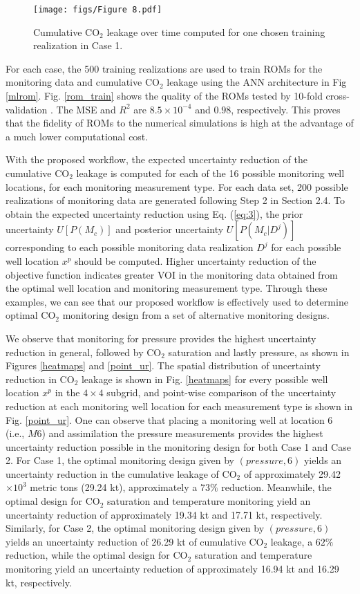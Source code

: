\documentclass[a4paper,fleqn]{cas-sc}
\begin{document}
\begin{figure}
    \centering
    \texttt{[image: figs/Figure 8.pdf]}
    \caption{Cumulative CO$_2$ leakage over time computed for one chosen training realization in Case 1.}
    \label{cum_leak_line}
\end{figure}

For each case, the 500 training realizations are used to train ROMs for the monitoring data and cumulative CO$_2$ leakage using the ANN architecture in Fig \ref{mlrom}. Fig. \ref{rom_train} shows the quality of the ROMs tested by 10-fold cross-validation \citep{Geisser1993, Xu2018249}. The MSE and $R^2$ are $8.5\times10^{-4}$ and $0.98$, respectively. This proves that the fidelity of ROMs to the numerical simulations is high at the advantage of a much lower computational cost.

With the proposed workflow, the expected uncertainty reduction of the cumulative CO$_2$ leakage is computed for each of the 16 possible monitoring well locations, for each monitoring measurement type. For each data set, 200 possible realizations of monitoring data are generated following Step 2 in Section 2.4. To obtain the expected uncertainty reduction using Eq. (\ref{eq:3}), the prior uncertainty $U[P(M_c)]$ and posterior uncertainty $U[P(M_c \vert D^j)]$ corresponding to each possible monitoring data realization $D^j$ for each possible well location $x^p$ should be computed. Higher uncertainty reduction of the objective function indicates greater VOI in the monitoring data obtained from the optimal well location and monitoring measurement type. Through these examples, we can see that our proposed workflow is effectively used to determine optimal CO$_2$ monitoring design from a set of alternative monitoring designs.

We observe that monitoring for pressure provides the highest uncertainty reduction in general, followed by CO$_2$ saturation and lastly pressure, as shown in Figures \ref{heatmaps} and \ref{point_ur}. The spatial distribution of uncertainty reduction in CO$_2$ leakage is shown in Fig. \ref{heatmaps} for every possible well location $x^p$ in the $4 \times 4$ subgrid, and point-wise comparison of the uncertainty reduction at each monitoring well location for each measurement type is shown in Fig. \ref{point_ur}. One can observe that placing a monitoring well at location 6 (i.e., $M6$) and assimilation the pressure measurements provides the highest uncertainty reduction possible in the monitoring design for both Case 1 and Case 2. For Case 1, the optimal monitoring design given by $(pressure, 6)$ yields an uncertainty reduction in the cumulative leakage of CO$_2$ of approximately 29.42$\times 10^3$ metric tons (29.24 kt), approximately a $73\%$ reduction. Meanwhile, the optimal design for CO$_2$ saturation and temperature monitoring yield an uncertainty reduction of approximately 19.34 kt and 17.71 kt, respectively. Similarly, for Case 2, the optimal monitoring design given by $(pressure, 6)$ yields an uncertainty reduction of 26.29 kt of cumulative CO$_2$ leakage, a $62\%$ reduction, while the optimal design for CO$_2$ saturation and temperature monitoring yield an uncertainty reduction of approximately 16.94 kt and 16.29 kt, respectively.
\end{document}
